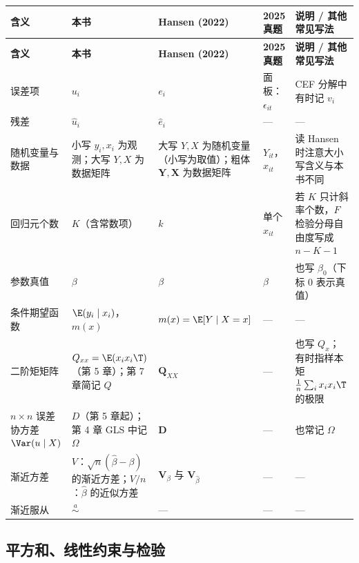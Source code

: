 {\renewcommand{\arraystretch}{1.15}\begin{longtable}{@{}>{\raggedright\arraybackslash\small}p{2.3cm}>{\raggedright\arraybackslash\small}p{3.7cm}>{\raggedright\arraybackslash\small}p{3.0cm}>{\raggedright\arraybackslash\small}p{2.2cm}>{\raggedright\arraybackslash\small}p{3.4cm}@{}}
\toprule
\textbf{含义} & \textbf{本书} & \textbf{Hansen (2022)} & \textbf{2025 真题} & \textbf{说明 / 其他常见写法}\\
\midrule
\endfirsthead
\toprule
\textbf{含义} & \textbf{本书} & \textbf{Hansen (2022)} & \textbf{2025 真题} & \textbf{说明 / 其他常见写法}\\
\midrule
\endhead
\bottomrule
\endlastfoot
误差项 & $u_i$ & $e_i$ & 面板：$\epsilon_{it}$ & CEF 分解中有时记 $v_i$\\
\addlinespace[1pt]
残差 & $\hat u_i$ & $\hat e_i$ & — & —\\
\addlinespace[1pt]
随机变量与数据 & 小写 $y_i,x_i$ 为观测；大写 $Y,X$ 为数据矩阵 & 大写 $Y,X$ 为随机变量（小写为取值）；粗体 $\bm Y,\bm X$ 为数据矩阵 & $Y_{it}$，$x_{it}$ & 读 Hansen 时注意大小写含义与本书不同\\
\addlinespace[1pt]
回归元个数 & $K$（含常数项） & $k$ & 单个 $x_{it}$ & 若 $K$ 只计斜率个数，$F$ 检验分母自由度写成 $n-K-1$\\
\addlinespace[1pt]
参数真值 & $\beta$ & $\beta$ & $\beta$ & 也写 $\beta_0$（下标 0 表示真值）\\
\addlinespace[1pt]
条件期望函数 & $\E(y_i\mid x_i)$，$m(x)$ & $m(x)=\E[Y\mid X=x]$ & — & —\\
\addlinespace[1pt]
二阶矩矩阵 & $Q_{xx}=\E(x_ix_i\T)$（第 5 章）；第 7 章简记 $Q$ & $\bm Q_{XX}$ & — & 也写 $Q_x$；有时指样本矩 $\frac1n\sum_i x_ix_i\T$ 的极限\\
\addlinespace[1pt]
$n\times n$ 误差协方差 $\Var(u\mid X)$ & $D$（第 5 章起）；第 4 章 GLS 中记 $\Omega$ & $\bm D$ & — & 也常记 $\Omega$\\
\addlinespace[1pt]
渐近方差 & $V$：$\sqrt n(\hat\beta-\beta)$ 的渐近方差；$V/n$：$\hat\beta$ 的近似方差 & $\bm V_{\beta}$ 与 $\bm V_{\hat\beta}$ & — & —\\
\addlinespace[1pt]
渐近服从 & $\overset{a}{\sim}$ & — & — & —\\
\end{longtable}}


\subsection{平方和、线性约束与检验}

